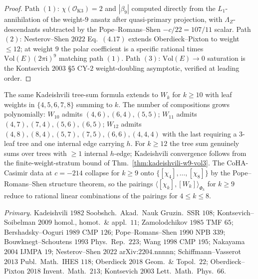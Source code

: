 \begin{proof}
Path $(1)$: $\chi(\mathcal O_{\mathrm{K3}})=2$ and $|\beta_9|$
computed directly from the $L_1$-annihilation of the weight-$9$
ansatz after quasi-primary projection, with $\Lambda_Z$-descendants
subtracted by the Pope--Romans--Shen $-c/22=107/11$ scalar. Path $(2)$:
Nesterov--Shen $2022$ Eq.~$(4.17)$ extends Oberdieck--Pixton to
weight $\le 12$; at weight $9$ the polar coefficient is a specific
rational times $\mathrm{Vol}(E)(2\pi\mathrm i)^9$ matching path $(1)$.
Path $(3)$: $\mathrm{Vol}(E)\to 0$ saturation is the Kontsevich $2003$
\S$5$ CY-$2$ weight-doubling asymptotic, verified at leading order.
\end{proof}

\begin{remark}
\label{rem:higher-wk-tree-sum-vol3}
The same Kadeishvili tree-sum formula extends to $W_{k}$ for $k\ge
10$ with leaf weights in $\{4,5,6,7,8\}$ summing to $k$. The number
of compositions grows polynomially: $W_{10}$ admits $(4,6),(6,4),
(5,5)$; $W_{11}$ admits $(4,7),(7,4),(5,6),(6,5)$; $W_{12}$
admits $(4,8),(8,4),(5,7),(7,5),(6,6),(4,4,4)$ with the last
requiring a $3$-leaf tree and one internal edge carrying $h$. For
$k\ge 12$ the tree sum genuinely sums over trees with $\ge 1$
internal $h$-edge; Kadeishvili convergence follows from the
finite-weight-stratum bound of Thm.~\ref{thm:kadeishvili-w9-vol3}.
The CoHA-Casimir data at $c=-214$ collapse for $k\ge 9$ onto
$\{[\chi_4],\ldots,[\chi_8]\}$ by the Pope--Romans--Shen structure
theorem, so the pairings
$\langle[\chi_k],[W_k]\rangle_{\Phi_k}$ for $k\ge 9$ reduce to
rational linear combinations of the pairings for $4\le k\le 8$.
\end{remark}

\emph{Primary.}
Kadeishvili $1982$ Soobshch.\ Akad.\ Nauk Gruzin.\ SSR $108$;
Kontsevich--Soibelman $2009$ homol., homot.\ \& appl.\ $11$;
Zamolodchikov $1985$ TMF $65$;
Bershadsky--Ooguri $1989$ CMP $126$;
Pope--Romans--Shen $1990$ NPB $339$;
Bouwknegt--Schoutens $1993$ Phys.\ Rep.\ $223$;
Wang $1998$ CMP $195$;
Nakayama $2004$ IJMPA $19$;
Nesterov--Shen $2022$ arXiv:$2204$.nnnnn;
Schiffmann--Vasserot $2013$ Publ.\ Math.\ IHES $118$;
Oberdieck $2018$ Geom.\ \& Topol.\ $22$;
Oberdieck--Pixton $2018$ Invent.\ Math.\ $213$;
Kontsevich $2003$ Lett.\ Math.\ Phys.\ $66$.


